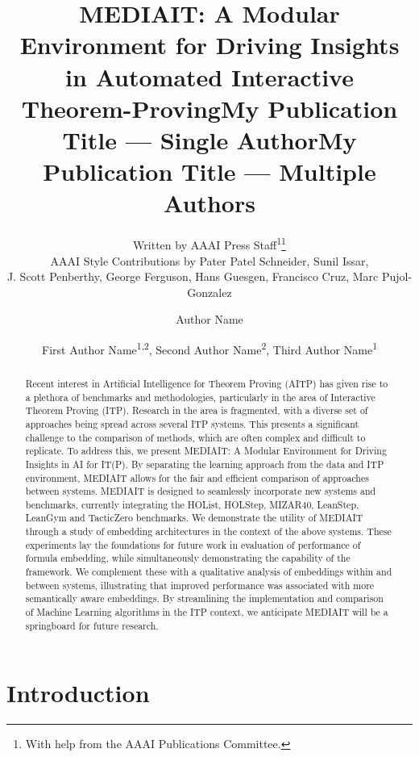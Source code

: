 \documentclass[letterpaper]{article} %
\title{MEDIAIT: A Modular Environment for Driving Insights in Automated Interactive Theorem-Proving}
\author{
    Written by AAAI Press Staff\textsuperscript{\rm 1}\thanks{With help from the AAAI Publications Committee.}\\
    AAAI Style Contributions by Pater Patel Schneider,
    Sunil Issar,\\
    J. Scott Penberthy,
    George Ferguson,
    Hans Guesgen,
    Francisco Cruz\equalcontrib,
    Marc Pujol-Gonzalez\equalcontrib
}
\title{My Publication Title --- Single Author}
\author {
    Author Name
}
\title{My Publication Title --- Multiple Authors}
\author {
    First Author Name\textsuperscript{\rm 1,\rm 2},
    Second Author Name\textsuperscript{\rm 2},
    Third Author Name\textsuperscript{\rm 1}
}
\begin{document}
    \maketitle

    \begin{abstract}
        Recent interest in Artificial Intelligence for Theorem Proving (AITP) has given rise to a plethora of benchmarks and
        methodologies,
        particularly in the area of Interactive Theorem Proving (ITP).
        Research in the area is fragmented, with a diverse set of approaches being spread across several ITP systems.
        This presents a significant challenge to the comparison of methods, which are often complex and difficult to replicate.
        To address this, we present MEDIAIT: A Modular Environment for Driving Insights in AI for IT(P).
        By separating the learning approach from the data and ITP environment, MEDIAIT allows for the fair and efficient
        comparison of approaches between systems.
        MEDIAIT is designed to seamlessly incorporate new systems and benchmarks, currently integrating the HOList, HOLStep,
        MIZAR40, LeanStep, LeanGym and TacticZero benchmarks.
        We demonstrate the utility of MEDIAIT through a study of embedding architectures in the context of the above systems.
        These experiments lay the foundations for future work in evaluation of performance of formula embedding,
        while simultaneously demonstrating the capability of the framework.
        We complement these with a qualitative analysis of embeddings within and between systems, illustrating that improved
        performance was associated with more semantically aware embeddings.
        By streamlining the implementation and comparison of Machine Learning algorithms in the ITP context,
        we anticipate MEDIAIT will be a springboard for future
        research.

    \end{abstract}


    \section{Introduction}
\end{document}
